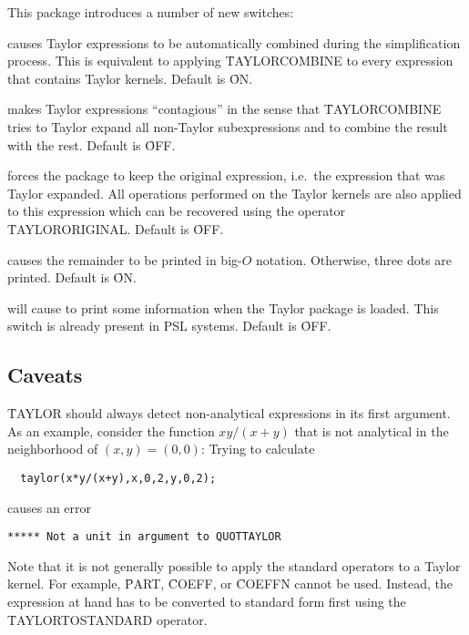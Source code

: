 This package introduces a number of new switches:
\begin{description}

\item[\sw{TAYLORAUTOCOMBINE}] \hypertarget{switch:TAYLORAUTOCOMBINE}{}causes
    Taylor expressions to be automatically combined during the simplification
    process.  This is equivalent to applying \f{TAYLORCOMBINE} to
    every expression that contains Taylor kernels.
    Default is \f{ON}.

\item[\sw{TAYLORAUTOEXPAND}] \hypertarget{switch:TAYLORAUTOEXPAND}{} makes Taylor expressions ``contagious''
    in the sense that \f{TAYLORCOMBINE} tries to Taylor expand
    all non-Taylor subexpressions and to combine the result with the
    rest. Default is \f{OFF}.

\hypertarget{switch:TAYLORKEEPORIGINAL}{}
\item[\sw{TAYLORKEEPORIGINAL}] forces the
    package to keep the original expression, i.e.\ the expression
    that was Taylor expanded.  All operations performed on the
    Taylor kernels are also applied to this expression  which can
    be recovered using the operator \f{TAYLORORIGINAL}.
    Default is \f{OFF}.

\hypertarget{switch:TAYLORPRINTORDER}{}
\item[\sw{TAYLORPRINTORDER}] causes the
    remainder to be printed in big-$O$ notation.  Otherwise, three
    dots are printed. Default is \f{ON}.

\item[\sw{VERBOSELOAD}] will cause
    \REDUCE{} to print some information when the Taylor package is
    loaded.  This switch is already present in \textsf{PSL} systems.
    Default is \f{OFF}.

\end{description}

\subsection{Caveats}

\f{TAYLOR} should always detect non-analytical expressions in
its first argument. As an example, consider the function $xy/(x+y)$
that is not analytical in the neighborhood of $(x,y) = (0,0)$: Trying
to calculate
\begin{verbatim}
  taylor(x*y/(x+y),x,0,2,y,0,2);
\end{verbatim}
causes an error
\begin{verbatim}
***** Not a unit in argument to QUOTTAYLOR
\end{verbatim}
Note that it is not generally possible to apply the standard \REDUCE{}
operators to a Taylor kernel. For example, \f{PART}, \f{COEFF},
or \f{COEFFN} cannot be used. Instead, the expression at hand has
to be converted to standard form first using the \f{TAYLORTOSTANDARD}
operator.

